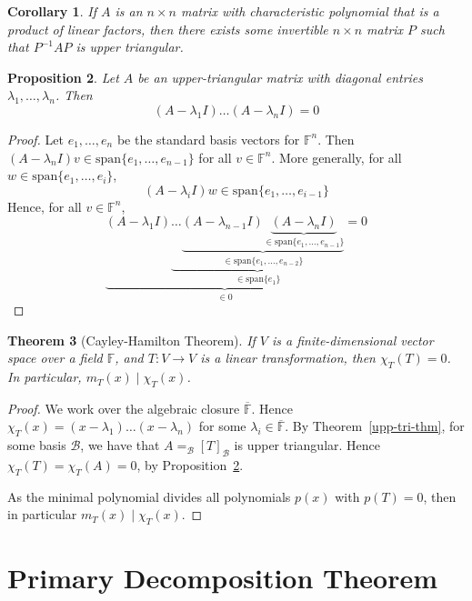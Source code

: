 \documentclass[10pt,fleqn]{article}
\newcommand{\spa}{\mathrm{span}}
\newcommand{\field}{\mathbb{F}}
\newcommand{\basis}{\mathcal{B}}
\theoremstyle{definition} \newtheorem{defn}{Definition}[section]
\theoremstyle{plain}      \newtheorem{thm}[defn]{Theorem}
\theoremstyle{plain}      \newtheorem{prop}[defn]{Proposition}
\theoremstyle{plain}      \newtheorem{lem}[defn]{Lemma}
\theoremstyle{plain}      \newtheorem{cor}[defn]{Corollary}
\theoremstyle{plain}      \newtheorem{ad}[defn]{Addendum}
\theoremstyle{definition} \newtheorem{ex}[defn]{Example}
\theoremstyle{definition} \newtheorem{rem}[defn]{Remark}
\numberwithin{equation}{subsection}
\begin{document}
\begin{cor}
    If $A$ is an $n\times n$ matrix with characteristic polynomial that is a product of linear factors, then there exists some invertible $n\times n$ matrix $P$ such that $P^{-1}AP$ is upper triangular.
\end{cor}

\begin{prop}\label{upp-tri-vanish}
    Let $A$ be an upper-triangular matrix with diagonal entries $\lambda_1,\ldots,\lambda_n$.
    Then
    \[
        (A-\lambda_1I)\ldots(A-\lambda_nI)=0
    \]
\end{prop}

\begin{proof}
    Let $e_1,\ldots,e_n$ be the standard basis vectors for $\field^n$.
    Then $(A-\lambda_nI)v\in\spa\{e_1,\ldots,e_{n-1}\}$ for all $v\in\field^n$.
    More generally, for all $w\in\spa\{e_1,\ldots,e_i\}$,
    \[
        (A-\lambda_iI)w\in
        \spa\{e_1,\ldots,e_{i-1}\}
    \]
    Hence, for all $v\in\field^n$,
    \[
        \underbrace{(A-\lambda_1I)\underbrace{\ldots\underbrace{(A-\lambda_{n-1}I)\underbrace{(A-\lambda_nI)}_{\in\spa\{e_1,\ldots,e_{n-1}\}}}_{\in\spa\{e_1,\ldots,e_{n-2}\}}}_{\in\spa\{e_1\}}}_{\in 0}=
        0
    \]
\end{proof}

\begin{thm}[Cayley-Hamilton Theorem]
    If $V$ is a finite-dimensional vector space over a field $\field$, and $T:V\to V$ is a linear transformation, then $\chi_T(T)=0$.
    In particular, $m_T(x)\mid\chi_T(x)$.
\end{thm}

\begin{proof}
    We work over the algebraic closure $\overline{\field}$.
    Hence $\chi_T(x)=(x-\lambda_1)\ldots(x-\lambda_n)$ for some $\lambda_i\in\overline{\field}$.
    By Theorem~\ref{upp-tri-thm}, for some basis $\basis$, we have that $A=_{\basis}[T]_{\basis}$ is upper triangular.
    Hence $\chi_T(T)=\chi_T(A)=0$, by Proposition~\ref{upp-tri-vanish}.

    As the minimal polynomial divides all polynomials $p(x)$ with $p(T)=0$, then in particular $m_T(x)\mid\chi_T(x)$.
\end{proof}


\section{Primary Decomposition Theorem}
\end{document}
